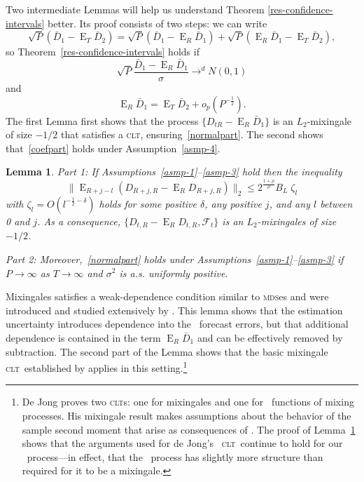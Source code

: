 \documentclass[11pt]{article}
\newtheorem{lem}[thm]{Lemma}
\DeclareMathOperator{\E}{E}
\newcommand{\couplingConstant}{\ensuremath{2^{\frac{1+\rho}{\rho}} B_L}}
\newcommand{\mds}{\textsc{mds}}
\newcommand{\clt}{\textsc{clt}}
\begin{document}
Two intermediate Lemmas will help us understand Theorem
\ref{res-confidence-intervals} better.  Its proof consists of two
steps: we can write
\begin{equation}
  \sqrt{P} (\bar{D}_1 - \E_T \bar{D}_2) = \sqrt{P} (\bar{D}_1 - \E_R
  \bar{D}_1) + \sqrt{P} (\E_R \bar{D}_1 - \E_T \bar{D}_2),
\end{equation}
so Theorem~\ref{res-confidence-intervals} holds if
\begin{equation}\label{normalpart}
  \sqrt{P}\frac{\bar{D}_1 - \E_R \bar{D}_1}{\sigma} \to^d N(0,1)
\end{equation}
and
\begin{equation}\label{coefpart}
  \E_R \bar{D}_1 = \E_T \bar{D}_2 + o_p(P^{-\frac12}).
\end{equation}
The first Lemma first shows that the process $\{D_{tR} - \E_R \bar
D_1\}$ is an $L_2$-mixingale of size $-1/2$ that satisfies a \clt,
ensuring~\eqref{normalpart}.  The second shows that~\eqref{coefpart}
holds under Assumption~\ref{asmp-4}.

\begin{lem}\label{res-mixingale}
  Part 1: If Assumptions~\ref{asmp-1}--\ref{asmp-3} hold then the inequality
  \begin{equation}\label{mixingaleR}
    \lVert \E_{R+j-l}(D_{R+j,R} - \E_R D_{R+j,R}) \rVert_2 \leq
    \couplingConstant \;
    \zeta_l
  \end{equation}
  with $\zeta_l = O(l^{-\frac12 - \delta})$ holds for some positive
  $\delta$, any positive $j$, and any $l$ between 0 and $j$.  As a
  consequence, $\{D_{t,R} - \E_R D_{t,R}, \mathcal F_t\}$ is an
  $L_2$-mixingales of size $-1/2$.  

  \noindent Part
  2: Moreover,~\eqref{normalpart} holds under
  Assumptions~\ref{asmp-1}--\ref{asmp-3} if $P \to \infty$ as $T \to
  \infty$ and $\sigma^2$ is a.s. uniformly positive.
\end{lem}

Mixingales satisfies a weak-dependence condition similar to \mds es
and were introduced and studied extensively by
\citet{mcleish_dependent_1974,mcleish_invariance_1975,mcleish_maximal_1975,mcleish_invariance_1977}.
This lemma shows that the estimation uncertainty introduces dependence
into the \oos\ forecast errors, but that additional dependence is
contained in the term $\E_R \bar D_1$ and can be effectively removed
by subtraction.  The second part of the Lemma shows that the basic
mixingale \clt\ established by \citet{de_jong_central_1997} applies in
this setting.\footnote{De Jong proves two \clt s: one for mixingales
  and one for \ned\ functions of mixing processes.  His mixingale
  result makes assumptions about the behavior of the sample second
  moment that arise as consequences of \ned.  The proof of
  Lemma~\ref{res-mixingale} shows that the arguments used for de
  Jong's \ned\ \clt\ continue to hold for our \oos\ process---in
  effect, that the \oos\ process has slightly more structure than
  required for it to be a mixingale.}
\end{document}

